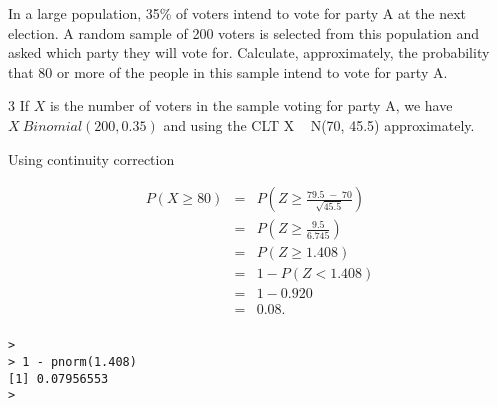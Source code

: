\documentclass[a4paper,12pt]{article}
\begin{document}
\largen
\noindent In a large population, 35\% of voters intend to vote for party A at the next election. A random sample of 200 voters is selected from this population and asked which party they will vote for.
Calculate, approximately, the probability that 80 or more of the people in this sample intend to vote for party A.


3
If $X$ is the number of voters in the sample voting for party A, we have $X ~ Binomial(200, 0.35)$ and using the CLT X ~ N(70, 45.5) approximately.

Using continuity correction



\begin{eqnarray*}
P( X \geq 80 ) &=& P\left( Z \geq  \frac{79.5 \;-\;70}{\sqrt{45.5}} \right)\\
&=& P\left( Z \geq  \frac{9.5 }{6.745} \right)\\
&=& P\left( Z \geq  1.408 \right)\\
&=& 1 − P(Z < 1.408) \\
&=& 1 − 0.920 \\
&=& 0.08.\\
\end{eqnarray*}



\begin{framed}
\begin{verbatim}
>
> 1 - pnorm(1.408)
[1] 0.07956553
>
\end{verbatim}
\end{framed}





\end{document}
